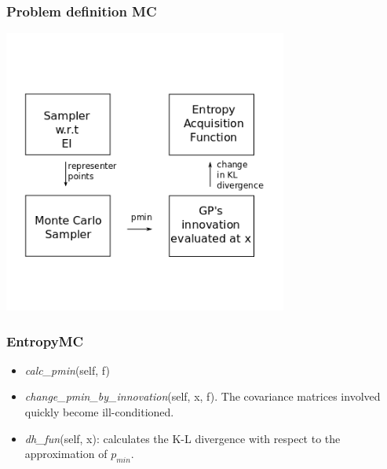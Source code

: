 \documentclass[10pt,handout]{beamer}
\begin{document}
\begin{frame}
\frametitle{Problem definition MC}

\begin{center}
\includegraphics[width=0.7\textwidth]{robo_entropy2.png}
\end{center}
\end{frame}



\begin{frame}
\frametitle{EntropyMC}

\begin{itemize}
  \item \emph{calc\_pmin}(self, f)
  \item \emph{change\_pmin\_by\_innovation}(self, x, f). The covariance matrices
  involved quickly become ill-conditioned.
  \item \emph{dh\_fun}(self, x): calculates the K-L divergence with respect to
  the approximation of $p_{min}$.
\end{itemize}

\end{frame}
\end{document}
